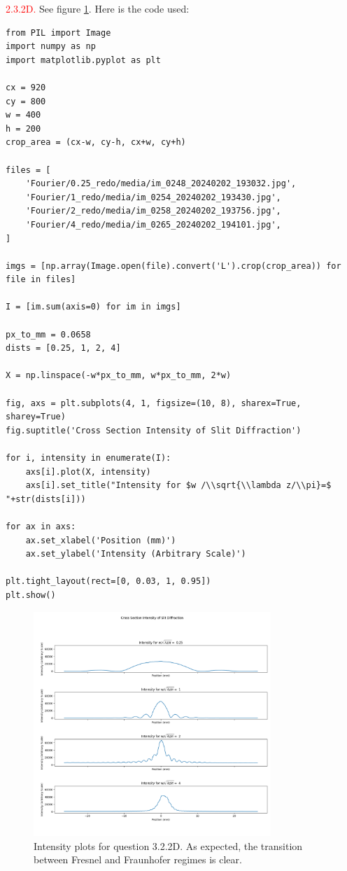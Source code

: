 \documentclass[letterpaper, reqno,11pt]{article}
\begin{document}
\noindent \textcolor{red}{2.3.2D.} See figure \ref{fig:3-2-2D}. Here is the code used:
\begin{lstlisting}
from PIL import Image
import numpy as np
import matplotlib.pyplot as plt

cx = 920
cy = 800
w = 400
h = 200
crop_area = (cx-w, cy-h, cx+w, cy+h)

files = [
    'Fourier/0.25_redo/media/im_0248_20240202_193032.jpg',
    'Fourier/1_redo/media/im_0254_20240202_193430.jpg',
    'Fourier/2_redo/media/im_0258_20240202_193756.jpg',
    'Fourier/4_redo/media/im_0265_20240202_194101.jpg',
]

imgs = [np.array(Image.open(file).convert('L').crop(crop_area)) for file in files]

I = [im.sum(axis=0) for im in imgs]

px_to_mm = 0.0658
dists = [0.25, 1, 2, 4]

X = np.linspace(-w*px_to_mm, w*px_to_mm, 2*w)

fig, axs = plt.subplots(4, 1, figsize=(10, 8), sharex=True, sharey=True)
fig.suptitle('Cross Section Intensity of Slit Diffraction')

for i, intensity in enumerate(I):
    axs[i].plot(X, intensity)
    axs[i].set_title("Intensity for $w /\\sqrt{\\lambda z/\\pi}=$ "+str(dists[i]))

for ax in axs:
    ax.set_xlabel('Position (mm)')
    ax.set_ylabel('Intensity (Arbitrary Scale)')

plt.tight_layout(rect=[0, 0.03, 1, 0.95])
plt.show()

\end{lstlisting}

\begin{figure}[tb]
    \centering
    \includegraphics[width=0.8\textwidth]{3-2-2D}
    \caption{Intensity plots for question 3.2.2D. As expected, the transition between Fresnel and Fraunhofer regimes is clear.}
    \label{fig:3-2-2D}
\end{figure}
 
\end{document}
